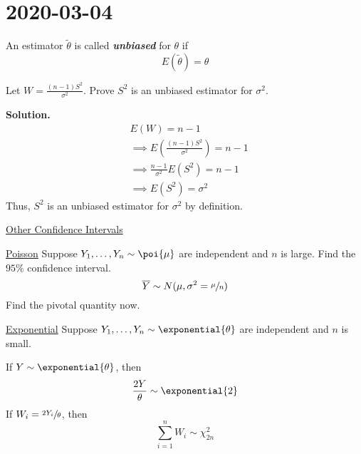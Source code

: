 \section{2020-03-04}

\begin{Definition}{}{}
    An estimator $ \tilde{\theta} $ is called \textbf{\emph{unbiased}} for $ \theta $ if
    \[ E(\tilde{\theta})=\theta \]
\end{Definition}


\begin{Example}{}{}
    Let $ W=\frac{(n-1)S^2}{\sigma^2} $. Prove $ S^2 $ is an unbiased
    estimator for $ \sigma^2 $.

    \textbf{Solution.}
    \begin{align*}
         & E(W)=n-1                                              \\
         & \implies E\left(\frac{(n-1)S^2}{\sigma^2} \right)=n-1 \\
         & \implies \frac{n-1}{\sigma^2} E(S^2)=n-1              \\
         & \implies E(S^2)=\sigma^2
    \end{align*}
    Thus, $ S^2 $ is an unbiased estimator for $ \sigma^2 $ by definition.
\end{Example}


\underline{Other Confidence Intervals}

\underline{Poisson}
Suppose $ Y_1,\ldots ,Y_n \sim \poi{\mu} $
are independent and $ n $ is large. Find the $ 95\% $ confidence interval.
\[ \overline{Y} \sim N(\mu,\sigma^2=\sfrac{\mu}{n}) \]
Find the pivotal quantity now.

\underline{Exponential}
Suppose $ Y_1,\ldots ,Y_n \sim \exponential{\theta} $ are independent and $ n $ is small.


\begin{Theorem}{}{}
    If $ Y \sim \exponential{\theta} $, then
    \[ \frac{2Y}{\theta} \sim \exponential{2} \]
    If $ W_i=\sfrac{2Y_i}{\theta} $, then
    \[ \sum\limits_{i=1}^{n} W_i \sim \chi^2_{2n} \]
\end{Theorem}

